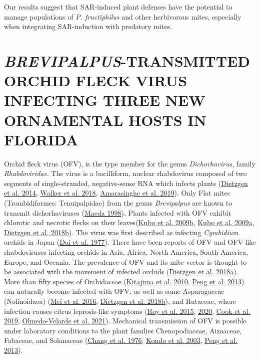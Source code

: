 \documentclass[12pt,final,CPage]{ufthesis}
\begin{document}
{  Our results suggest that SAR-induced plant defenses have the potential to manage populations of \emph{P. fructiphilus} and other herbivorous mites, especially when integrating SAR-induction with predatory mites.

  \hypertarget{brevipalpus-transmitted-orchid-fleck-virus-infecting-three-new-ornamental-hosts-in-florida}{%
  \chapter{\texorpdfstring{\emph{BREVIPALPUS}-TRANSMITTED ORCHID FLECK VIRUS INFECTING THREE NEW ORNAMENTAL HOSTS IN FLORIDA}{BREVIPALPUS-TRANSMITTED ORCHID FLECK VIRUS INFECTING THREE NEW ORNAMENTAL HOSTS IN FLORIDA}}\label{brevipalpus-transmitted-orchid-fleck-virus-infecting-three-new-ornamental-hosts-in-florida}}

  Orchid fleck virus (OFV), is the type member for the genus \emph{Dichorhavirus}, family \emph{Rhabdoviridae}. The virus is a bacilliform, nuclear rhabdovirus composed of two segments of single-stranded, negative-sense RNA which infects plants (\protect\hyperlink{ref-Dietzgen2014}{Dietzgen et al. 2014}, \protect\hyperlink{ref-Walker2018}{Walker et al. 2018}, \protect\hyperlink{ref-Amarasinghe2019}{Amarasinghe et al. 2019}). Only Flat mites (Trombidiformes: Tenuipalpidae) from the genus \emph{Brevipalpus} are known to transmit dichorhaviruses (\protect\hyperlink{ref-Maeda1998}{Maeda 1998}). Plants infected with OFV exhibit chlorotic and necrotic flecks on their leaves(\protect\hyperlink{ref-Kubo2009}{Kubo et al. 2009b}, \protect\hyperlink{ref-Kubo2009a}{Kubo et al. 2009a}, \protect\hyperlink{ref-Dietzgen2018a}{Dietzgen et al. 2018b}). The virus was first described as infecting \emph{Cymbidium} orchids in Japan (\protect\hyperlink{ref-Doi1977}{Doi et al. 1977}). There have been reports of OFV and OFV-like rhabdoviruses infecting orchids in Asia, Africa, North America, South America, Europe, and Oceania. The prevalence of OFV and its mite vector is thought to be associated with the movement of infected orchids (\protect\hyperlink{ref-Dietzgen2018}{Dietzgen et al. 2018a}). More than fifty species of Orchidaceae (\protect\hyperlink{ref-Kitajima2010}{Kitajima et al. 2010}, \protect\hyperlink{ref-Peng2013}{Peng et al. 2013}) can naturally become infected with OFV, as well as some Asparagaceae (Nolinoidaea) (\protect\hyperlink{ref-Mei2016}{Mei et al. 2016}, \protect\hyperlink{ref-Dietzgen2018a}{Dietzgen et al. 2018b}), and Rutaceae, where infection causes citrus leprosis-like symptoms (\protect\hyperlink{ref-Roy2015}{Roy et al. 2015}, \protect\hyperlink{ref-Roy2020}{2020}, \protect\hyperlink{ref-Cook2019}{Cook et al. 2019}, \protect\hyperlink{ref-Velarde2021}{Olmedo-Velarde et al. 2021}). Mechanical transmission of OFV is possible under laboratory conditions to the plant families Chenopodiaceae, Aizoaceae, Fabaceae, and Solanaceae (\protect\hyperlink{ref-Chang1976}{Chang et al. 1976}, \protect\hyperlink{ref-Kondo2003}{Kondo et al. 2003}, \protect\hyperlink{ref-Peng2013}{Peng et al. 2013}).

}
\end{document}

